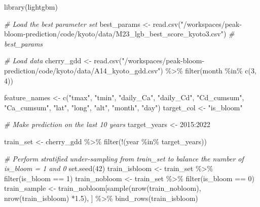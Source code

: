 \documentclass[
]{article}
\newenvironment{Shaded}{\begin{snugshade}}{\end{snugshade}}
\newcommand{\CommentTok}[1]{\textcolor[rgb]{0.56,0.35,0.01}{\textit{#1}}}
\newcommand{\DecValTok}[1]{\textcolor[rgb]{0.00,0.00,0.81}{#1}}
\newcommand{\FloatTok}[1]{\textcolor[rgb]{0.00,0.00,0.81}{#1}}
\newcommand{\FunctionTok}[1]{\textcolor[rgb]{0.00,0.00,0.00}{#1}}
\newcommand{\NormalTok}[1]{#1}
\newcommand{\OtherTok}[1]{\textcolor[rgb]{0.56,0.35,0.01}{#1}}
\newcommand{\SpecialCharTok}[1]{\textcolor[rgb]{0.00,0.00,0.00}{#1}}
\newcommand{\StringTok}[1]{\textcolor[rgb]{0.31,0.60,0.02}{#1}}
\begin{document}
\begin{Shaded}
\begin{Highlighting}[]
\FunctionTok{library}\NormalTok{(lightgbm)}

\CommentTok{\# Load the best parameter set}
\NormalTok{best\_params }\OtherTok{\textless{}{-}} \FunctionTok{read.csv}\NormalTok{(}\StringTok{"/workspaces/peak{-}bloom{-}prediction/code/kyoto/data/M23\_lgb\_best\_score\_kyoto3.csv"}\NormalTok{)}
\CommentTok{\# best\_params}

\CommentTok{\# Load data}
\NormalTok{cherry\_gdd }\OtherTok{\textless{}{-}} \FunctionTok{read.csv}\NormalTok{(}\StringTok{"/workspaces/peak{-}bloom{-}prediction/code/kyoto/data/A14\_kyoto\_gdd.csv"}\NormalTok{) }\SpecialCharTok{\%\textgreater{}\%}
    \FunctionTok{filter}\NormalTok{(month }\SpecialCharTok{\%in\%} \FunctionTok{c}\NormalTok{(}\DecValTok{3}\NormalTok{, }\DecValTok{4}\NormalTok{))  }

\NormalTok{feature\_names }\OtherTok{\textless{}{-}} \FunctionTok{c}\NormalTok{(}\StringTok{"tmax"}\NormalTok{, }\StringTok{"tmin"}\NormalTok{, }\StringTok{"daily\_Ca"}\NormalTok{, }\StringTok{"daily\_Cd"}\NormalTok{, }\StringTok{"Cd\_cumsum"}\NormalTok{, }\StringTok{"Ca\_cumsum"}\NormalTok{, }\StringTok{"lat"}\NormalTok{, }\StringTok{"long"}\NormalTok{, }\StringTok{"alt"}\NormalTok{, }\StringTok{"month"}\NormalTok{, }\StringTok{"day"}\NormalTok{)}
\NormalTok{target\_col }\OtherTok{\textless{}{-}} \StringTok{"is\_bloom"}

\CommentTok{\# Make prediction on the last 10 years}
\NormalTok{target\_years }\OtherTok{\textless{}{-}} \DecValTok{2015}\SpecialCharTok{:}\DecValTok{2022}

\NormalTok{train\_set }\OtherTok{\textless{}{-}}\NormalTok{ cherry\_gdd }\SpecialCharTok{\%\textgreater{}\%} \FunctionTok{filter}\NormalTok{(}\SpecialCharTok{!}\NormalTok{(year }\SpecialCharTok{\%in\%}\NormalTok{ target\_years))}

\CommentTok{\# Perform stratified under{-}sampling from train\_set to balance the number of is\_bloom = 1 and 0}
\FunctionTok{set.seed}\NormalTok{(}\DecValTok{42}\NormalTok{)}
\NormalTok{train\_isbloom }\OtherTok{\textless{}{-}}\NormalTok{ train\_set }\SpecialCharTok{\%\textgreater{}\%} \FunctionTok{filter}\NormalTok{(is\_bloom }\SpecialCharTok{==} \DecValTok{1}\NormalTok{)}
\NormalTok{train\_nobloom }\OtherTok{\textless{}{-}}\NormalTok{ train\_set }\SpecialCharTok{\%\textgreater{}\%} \FunctionTok{filter}\NormalTok{(is\_bloom }\SpecialCharTok{==} \DecValTok{0}\NormalTok{)}
\NormalTok{train\_sample }\OtherTok{\textless{}{-}}\NormalTok{ train\_nobloom[}\FunctionTok{sample}\NormalTok{(}\FunctionTok{nrow}\NormalTok{(train\_nobloom), }\FunctionTok{nrow}\NormalTok{(train\_isbloom) }\SpecialCharTok{*}\FloatTok{1.5}\NormalTok{), ] }\SpecialCharTok{\%\textgreater{}\%} \FunctionTok{bind\_rows}\NormalTok{(train\_isbloom)}


\end{Highlighting}
\end{Shaded}
\end{document}
